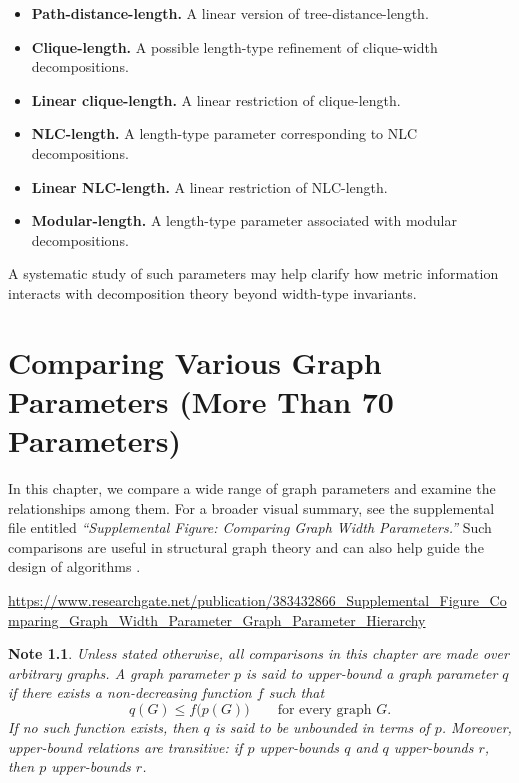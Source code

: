 \documentclass[10pt]{book}
\newtheorem{note}{Note}
\theoremstyle{definition}
\begin{document}
\begin{itemize}
    \item \textbf{Path-distance-length.}  
    A linear version of tree-distance-length.

    \item \textbf{Clique-length.}  
    A possible length-type refinement of clique-width decompositions.

    \item \textbf{Linear clique-length.}  
    A linear restriction of clique-length.

    \item \textbf{NLC-length.}  
    A length-type parameter corresponding to NLC decompositions.

    \item \textbf{Linear NLC-length.}  
    A linear restriction of NLC-length.

    \item \textbf{Modular-length.}  
    A length-type parameter associated with modular decompositions.
\end{itemize}

A systematic study of such parameters may help clarify how metric information interacts with decomposition theory beyond width-type invariants.

\newpage
  
\chapter{Comparing Various Graph Parameters (More Than 70 Parameters)}

In this chapter, we compare a wide range of graph parameters and examine the relationships among them.  
For a broader visual summary, see the supplemental file entitled
\textit{“Supplemental Figure: Comparing Graph Width Parameters.”}
Such comparisons are useful in structural graph theory and can also help guide the design of algorithms \cite{FujitaFigure2024}.

\url{https://www.researchgate.net/publication/383432866_Supplemental_Figure_Comparing_Graph_Width_Parameter_Graph_Parameter_Hierarchy}

\begin{note}
Unless stated otherwise, all comparisons in this chapter are made over arbitrary graphs.  
A graph parameter \(p\) is said to \emph{upper-bound} a graph parameter \(q\) if there exists a non-decreasing function \(f\) such that
\[
q(G)\leq f\bigl(p(G)\bigr)
\qquad
\text{for every graph } G.
\]
If no such function exists, then \(q\) is said to be \emph{unbounded in terms of} \(p\).  
Moreover, upper-bound relations are transitive: if \(p\) upper-bounds \(q\) and \(q\) upper-bounds \(r\), then \(p\) upper-bounds \(r\).
\end{note}
\end{document}
